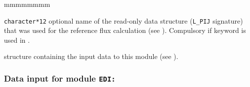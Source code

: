 \begin{ListeDeDescription}{mmmmmmmm}
\item[\dusa{REFPIJ}] {\tt character*12} optional name of the read-only  data
structure ({\tt L\_PIJ} signature) that was used for the reference flux calculation (see ).
Compulsory if keyword  is used in .

\item[\dstr{descedi}] structure containing the input data to this module
(see ).

\end{ListeDeDescription}

\clearpage

\subsubsection{Data input for module {\tt EDI:}}\label{sect:descedi}

